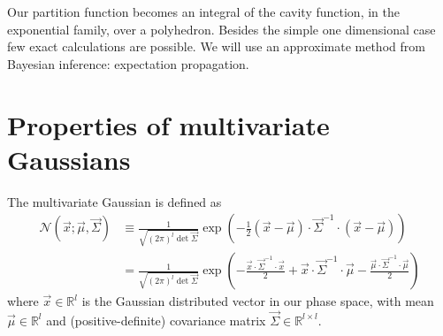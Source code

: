\documentclass[11pt,twoside]{report}
\begin{document}
Our partition function becomes an integral of the cavity function, in the exponential family, over a polyhedron.
Besides the simple one dimensional case few exact calculations are possible.
We will use an approximate method from Bayesian inference: expectation propagation.

\section{Properties of multivariate Gaussians}


The multivariate Gaussian is defined as
\begin{equation}
  \begin{split}
    \mathcal{N}(\vec{x}; \vec{\mu}, \vec{\Sigma})
    &\equiv
    \frac{1}{\sqrt{ (2\pi)^l \det{\vec{\Sigma}} }}
    \exp{\left(
      - \frac{1}{2} (\vec{x} - \vec{\mu}) \cdot \vec{\Sigma}^{-1} \cdot (\vec{x} - \vec{\mu})
      \right)}
    \\
    &=
    \frac{1}{\sqrt{ (2\pi)^l \det{\vec{\Sigma}} }}
    \exp{\left(
      - \frac{\vec{x} \cdot \vec{\Sigma}^{-1} \cdot \vec{x}}{2}
      + \vec{x} \cdot \vec{\Sigma}^{-1} \cdot \vec{\mu}
      - \frac{\vec{\mu} \cdot \vec{\Sigma}^{-1} \cdot \vec{\mu}}{2}
      \right)}
  \end{split}
\end{equation}
where $\vec{x} \in \mathbb{R}^l$ is the Gaussian distributed vector in our phase space, with mean $\vec{\mu} \in \mathbb{R}^l$ and (positive-definite) covariance matrix $\vec{\Sigma} \in \mathbb{R}^{l \times l}$.
\end{document}
